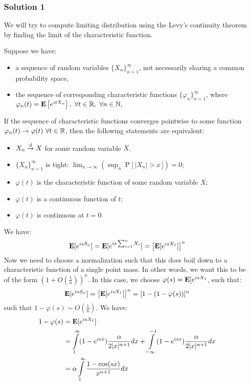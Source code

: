 \documentclass[../main/main.tex]{subfiles}
\begin{document}
\subsubsection*{Solution 1}
We will try to compute limiting distribution using the Levy's continuity theorem by finding the limit of the characteristic function.
\begin{theorem}
	Suppose we have:
	\begin{itemize}
		\item a sequence of random variables \(\{X_{n}\}_{n=1}^{\infty }\), not necessarily sharing a common probability space,
		\item the sequence of corresponding characteristic functions \(\{\varphi _{n}\}_{n=1}^{\infty }\), where\\ \(\varphi _{n}(t)={\text{\textbf{E}}} \left[e^{itX_{n}}\right],\ \forall t\in \mathbb {R} ,\ \forall n\in \mathbb {N} ,\)
	\end{itemize}
	If the sequence of characteristic functions converges pointwise to some function $\varphi_n(t) \to \varphi(t)\ \forall t \in \R$, then the following statements are equivalent:
	\begin{itemize}
		\item  $X_n \overset{d}{\to} X$ for some random variable $X$.
		\item $\{X_{n}\}_{n=1}^{\infty }$ is tight: $\lim _{x\to \infty }\left(\sup _{n}\operatorname {P} {\big [}\,|X_{n}|>x\,{\big ]}\right)=0$;
		\item $\varphi(t)$ is the characteristic function of some random variable $X$;
		\item $\varphi(t)$ is a continuous function of $t$;
		\item $\varphi(t)$ is continuous at $t=0$.
	\end{itemize}
\end{theorem}
We have: \[
	\text{\textbf{E}}[e^{is S_n}] = \text{\textbf{E}}[e^{is \sum_{i=1}^{n}X_i}] = \left[\text{\textbf{E}}[e^{is X_1}] \right]^{n}
\]
Now we need to choose a normalization such that this does boil down to a characteristic function of a single point mass. In other words, we want this to be of the form $(1+O(\frac{1}{n}))^{n}$. In this case, we choose $\varphi(s)=\text{\textbf{E}}[e^{is X_1}$, such that: \[
	\text{\textbf{E}}[e^{is S_n}] = \left[\text{\textbf{E}}[e^{is X_1}] \right]^{n} = [1-(1-\varphi(s))]^{n}
\] such that $1-\varphi(s) \sim O(\frac{1}{n})$. We have:
\begin{align}\label{28:eq3}
	1-\varphi(s) & = \text{\textbf{E}}[e^{is X_1}                                                  ]        \nonumber                                                                        \\
	             & = \int\limits_{1}^{\infty}(1-e^{isx}) \frac{\alpha}{2|x|^{\alpha+1}} dx + \int\limits_{-\infty}^{-1}(1-e^{isx}) \frac{\alpha}{2|x|^{\alpha+1}}dx \nonumber \\
	             & = \alpha \int\limits_{1}^{\infty} \frac{1-\cos(sx)}{x^{\alpha+1}} dx
\end{align}
\end{document}
